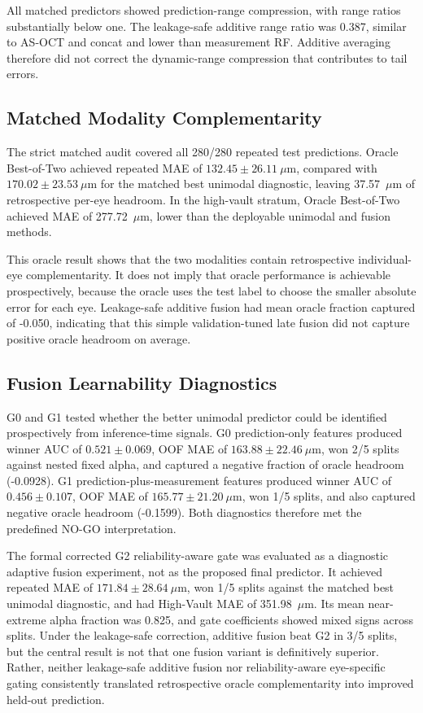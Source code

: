 \documentclass[10pt,twocolumn]{article}
\begin{document}
All matched predictors showed prediction-range compression, with range ratios substantially below one. The leakage-safe additive range ratio was 0.387, similar to AS-OCT and concat and lower than measurement RF. Additive averaging therefore did not correct the dynamic-range compression that contributes to tail errors.

\subsection{Matched Modality Complementarity}

The strict matched audit covered all 280/280 repeated test predictions. Oracle Best-of-Two achieved repeated MAE of $132.45 \pm 26.11~\mu$m, compared with $170.02 \pm 23.53~\mu$m for the matched best unimodal diagnostic, leaving 37.57~$\mu$m of retrospective per-eye headroom. In the high-vault stratum, Oracle Best-of-Two achieved MAE of 277.72~$\mu$m, lower than the deployable unimodal and fusion methods.

This oracle result shows that the two modalities contain retrospective individual-eye complementarity. It does not imply that oracle performance is achievable prospectively, because the oracle uses the test label to choose the smaller absolute error for each eye. Leakage-safe additive fusion had mean oracle fraction captured of -0.050, indicating that this simple validation-tuned late fusion did not capture positive oracle headroom on average.

\subsection{Fusion Learnability Diagnostics}

G0 and G1 tested whether the better unimodal predictor could be identified prospectively from inference-time signals. G0 prediction-only features produced winner AUC of $0.521 \pm 0.069$, OOF MAE of $163.88 \pm 22.46~\mu$m, won 2/5 splits against nested fixed alpha, and captured a negative fraction of oracle headroom (-0.0928). G1 prediction-plus-measurement features produced winner AUC of $0.456 \pm 0.107$, OOF MAE of $165.77 \pm 21.20~\mu$m, won 1/5 splits, and also captured negative oracle headroom (-0.1599). Both diagnostics therefore met the predefined NO-GO interpretation.

The formal corrected G2 reliability-aware gate was evaluated as a diagnostic adaptive fusion experiment, not as the proposed final predictor. It achieved repeated MAE of $171.84 \pm 28.64~\mu$m, won 1/5 splits against the matched best unimodal diagnostic, and had High-Vault MAE of 351.98~$\mu$m. Its mean near-extreme alpha fraction was 0.825, and gate coefficients showed mixed signs across splits. Under the leakage-safe correction, additive fusion beat G2 in 3/5 splits, but the central result is not that one fusion variant is definitively superior. Rather, neither leakage-safe additive fusion nor reliability-aware eye-specific gating consistently translated retrospective oracle complementarity into improved held-out prediction.
\end{document}
